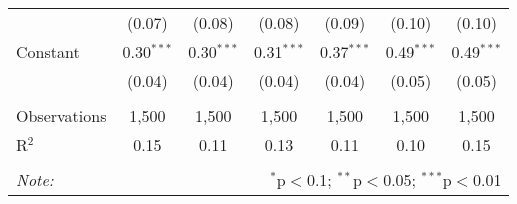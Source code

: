 \documentclass[
]{article}
\begin{document}
\begin{sidewaystable}[!htbp]
\begin{tabular}{@{\extracolsep{1pt}}lcccccc}
  & (0.07) & (0.08) & (0.08) & (0.09) & (0.10) & (0.10) \\ 
  Constant & 0.30$^{***}$ & 0.30$^{***}$ & 0.31$^{***}$ & 0.37$^{***}$ & 0.49$^{***}$ & 0.49$^{***}$ \\ 
  & (0.04) & (0.04) & (0.04) & (0.04) & (0.05) & (0.05) \\ 
 \hline \\[-1.8ex] 
Observations & 1,500 & 1,500 & 1,500 & 1,500 & 1,500 & 1,500 \\ 
R$^{2}$ & 0.15 & 0.11 & 0.13 & 0.11 & 0.10 & 0.15 \\ 
\hline 
\hline \\[-1.8ex] 
\textit{Note:}  & \multicolumn{6}{r}{$^{*}$p$<$0.1; $^{**}$p$<$0.05; $^{***}$p$<$0.01} \\ 
\end{tabular} 
\end{sidewaystable}
\end{document}
